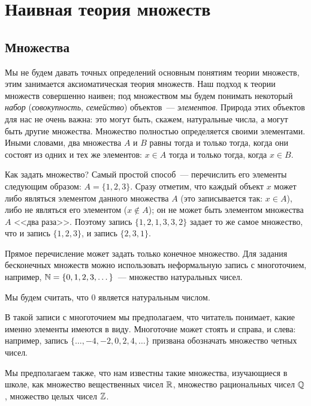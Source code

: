 
\section{Наивная теория множеств}

\subsection{Множества}


Мы не будем давать точных определений основным понятиям теории
множеств, этим занимается аксиоматическая теория множеств. Наш подход
к теории множеств совершенно наивен; под множеством мы будем понимать
некоторый {\it набор} ({\it совокупность}, {\it семейство})
объектов~--- {\it элементов}. Природа этих объектов для нас не очень
важна: это могут
быть, скажем, натуральные числа, а могут быть другие
множества. Множество полностью определяется своими элементами. Иными
словами, два множества $A$ и $B$ равны тогда и только тогда, когда они
состоят из одних и тех же элементов: $x\in A$ тогда и только тогда,
когда $x\in B$.

Как задать множество? Самый простой способ~--- перечислить его
элементы следующим образом: $A=\{1,2,3\}$.
Сразу отметим, что каждый
объект $x$ может либо являться элементом данного множества $A$ (это
записывается так: $x\in A$), либо не
являться его элементом ($x\not\in A$); он не может быть элементом
множества $A$ <<два раза>>. Поэтому запись $\{1,2,1,3,3,2\}$ задает то
же самое множество, что и запись $\{1,2,3\}$, и запись $\{2,3,1\}$.

Прямое перечисление может задать только конечное множество. Для
задания бесконечных множеств можно использовать неформальную запись с
многоточием, например, $\mathbb N=\{0,1,2,3,\dots\}$~--- множество натуральных
чисел.

\begin{remark}
Мы будем считать, что $0$ является натуральным числом.
\end{remark}

В такой записи с многоточием мы предполагаем, что читатель понимает,
какие именно элементы имеются в виду. Многоточие может стоять и
справа, и слева: например, запись $\{\dots,-4,-2,0,2,4,\dots\}$ призвана
обозначать множество четных чисел.

Мы предполагаем также, что нам известны такие множества, изучающиеся в
школе, как множество вещественных чисел $\mathbb R$, множество
рациональных чисел $\mathbb Q$, множество целых чисел $\mathbb Z$.

